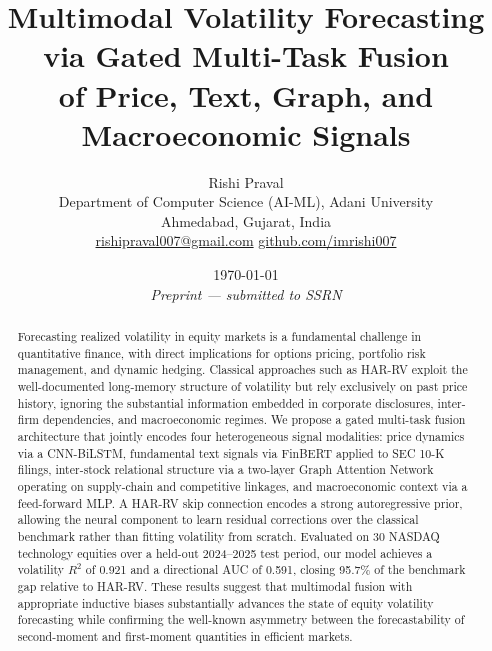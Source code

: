 \documentclass[12pt, a4paper]{article}
\begin{document}
\title{\textbf{Multimodal Volatility Forecasting via Gated Multi-Task Fusion\\
of Price, Text, Graph, and Macroeconomic Signals}}

\author{
    Rishi Praval \\
    \small Department of Computer Science (AI-ML), Adani University \\
    \small Ahmedabad, Gujarat, India \\
    \small \href{mailto:rishipraval007@gmail.com}{rishipraval007@gmail.com} \quad
    \href{https://github.com/imrishi007}{github.com/imrishi007}
}

\date{\today \\ \small \textit{Preprint — submitted to SSRN}}

\maketitle
\thispagestyle{empty}

\begin{abstract}
Forecasting realized volatility in equity markets is a fundamental challenge in quantitative finance, with direct implications for options pricing, portfolio risk management, and dynamic hedging. Classical approaches such as HAR-RV exploit the well-documented long-memory structure of volatility but rely exclusively on past price history, ignoring the substantial information embedded in corporate disclosures, inter-firm dependencies, and macroeconomic regimes. We propose a gated multi-task fusion architecture that jointly encodes four heterogeneous signal modalities: price dynamics via a CNN-BiLSTM, fundamental text signals via FinBERT applied to SEC 10-K filings, inter-stock relational structure via a two-layer Graph Attention Network operating on supply-chain and competitive linkages, and macroeconomic context via a feed-forward MLP. A HAR-RV skip connection encodes a strong autoregressive prior, allowing the neural component to learn residual corrections over the classical benchmark rather than fitting volatility from scratch. Evaluated on 30 NASDAQ technology equities over a held-out 2024--2025 test period, our model achieves a volatility $R^2$ of 0.921 and a directional AUC of 0.591, closing 95.7\% of the benchmark gap relative to HAR-RV. These results suggest that multimodal fusion with appropriate inductive biases substantially advances the state of equity volatility forecasting while confirming the well-known asymmetry between the forecastability of second-moment and first-moment quantities in efficient markets.
\end{abstract}
\end{document}
